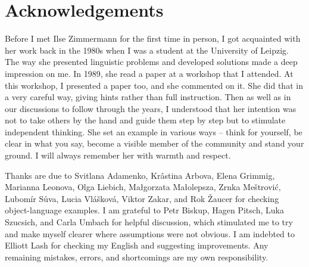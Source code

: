 \documentclass[output=paper]{langscibook}
\begin{document}
\section*{Acknowledgements}

Before I met Ilse Zimmermann for the first time in person, I got acquainted with her work back in the 1980s when I was a student at the University of Leipzig. The way she presented linguistic problems and developed solutions made a deep impression on me. In 1989, she read a paper at a workshop that I attended. At this workshop, I presented a paper too, and she commented on it.  She did that in a very careful way, giving hints rather than full instruction. Then as well as in our discussions to follow through the years, I understood that her intention was not to take others by the hand and guide them step by step but to stimulate independent thinking. She set an example in various ways -- think for yourself, be clear in what you say, become a visible member of the community and stand your ground. I will always remember her with warmth and respect.

Thanks are due to Svitlana Adamenko, Krâstina Arbova, Elena Grimmig, Ma\-rian\-na Leonova, Olga Liebich, Małgorzata Małolepsza, Zrnka Meštrović, Lubomír Sůva, Lucia Vlášková, Viktor Zakar, and Rok Žaucer for checking object-language examples. I am grateful to Petr Biskup, Hagen Pitsch, Luka Szucsich, and Carla Umbach for helpful discussion, which stimulated me to try and make myself clearer where assumptions were not obvious. I am indebted to Elliott Lash for checking my English and suggesting improvements. Any remaining mistakes, errors, and shortcomings are my own responsibility.


\sloppy\printbibliography[heading=subbibliography,notkeyword=this]
\end{document}
